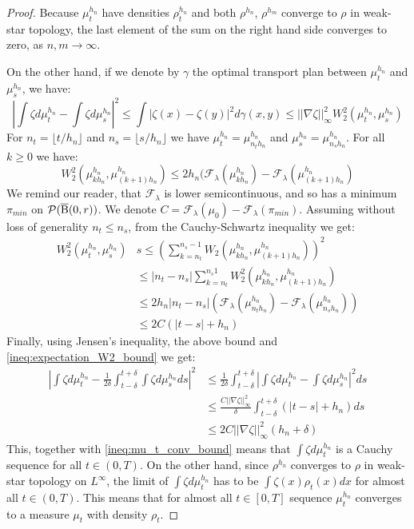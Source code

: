 \begin{proof}
Because $\mu_t^{h_n}$ have densities $\rho_t^{h_n}$ and both $\rho^{h_n}$, $\rho^{h_m}$ converge to $\rho$ in weak-star topology, the last element of the sum on the right hand side converges to zero, as $n,m \rightarrow \infty$.

On the other hand, if we denote by $\gamma$ the optimal transport plan between $\mu_t^{h_n}$ and $\mu_s^{h_n}$, we have:
\begin{equation} \label{ineq:expectation_W2_bound}
\left| \int \zeta d\mu_t^{h_n} - \int \zeta d\mu_s^{h_n} \right|^2 \leq \int \left| \zeta(x) - \zeta(y) \right|^2 d\gamma(x,y) \leq ||\nabla \zeta||_{\infty}^2 W_2^2(\mu_t^{h_n}, \mu_s^{h_n})
\end{equation}
For $n_t = \lfloor t/h_n \rfloor$ and $n_s = \lfloor s/h_n \rfloor$ we have $\mu_t^{h_n} = \mu_{n_t h_n}^{h_n}$ and $\mu_s^{h_n} = \mu_{n_s h_n}^{h_n}$. For all $k \geq 0$ we have:
\[
W_2^2(\mu_{kh_n}^{h_n}, \mu_{(k+1)h_n}^{h_n}) \leq 2h_n(\mathcal{F}_{\lambda}(\mu_{kh_n}^{h_n}) - \mathcal{F}_{\lambda}(\mu_{(k+1)h_n}^{h_n}) 
\]
We remind our reader, that $\mathcal{F}_{\lambda}$ is lower semicontinuous, and so has a minimum $\pi_{min}$ on $\mathcal{P}(\operatorname{\overline{B}}(0,r))$. We denote $C = \mathcal{F}_{\lambda}(\mu_0) - \mathcal{F}_{\lambda}(\pi_{min})$. Assuming without loss of generality $n_t \leq n_s$, from the Cauchy-Schwartz inequality we get:
\[
\begin{aligned}
W_2^2(\mu_{t}^{h_n}, \mu_s^{h_n}) & s\leq \left( \sum_{k= n_t}^{n_s-1} W_2(\mu_{kh_n}^{h_n}, \mu_{(k+1)h_n}^{h_n}) \right)^2 \\
& \leq |n_t - n_s|\sum_{k=n_t}^{n_s 1} W_2^2(\mu_{kh_n}^{h_n}, \mu_{(k+1)h_n}^{h_n}) \\
& \leq 2h_n|n_t - n_s|(\mathcal{F}_{\lambda}(\mu_{n_t h_n}^{h_n}) - \mathcal{F}_{\lambda}(\mu_{n_s h_n}^{h_n})) \\
& \leq 2C(|t-s| + h_n)
\end{aligned}
\]
Finally, using Jensen's inequality, the above bound and \ref{ineq:expectation_W2_bound} we get:
\[
\begin{aligned}
\left| \int \zeta d\mu_t^{h_n} - \frac{1}{2\delta} \int_{t - \delta}^{t + \delta} \int \zeta d\mu_s^{h_n} ds \right|^2 & \leq \frac{1}{2\delta} \int_{t - \delta}^{t + \delta} \left| \int \zeta d\mu_{t}^{h_n} - \int \zeta d\mu_s^{h_n} \right|^2 ds \\
& \leq \frac{C ||\nabla \zeta||_{\infty}^2}{\delta} \int_{t-\delta}^{t+\delta} (|t-s| +h_n) ds \\
& \leq 2C ||\nabla \zeta||_{\infty}^2 (h_n + \delta)
\end{aligned}
\]
This, together with \ref{ineq:mu_t_conv_bound} means that $\int \zeta d\mu_t^{h_n}$ is a Cauchy sequence for all $t \in (0, T)$. On the other hand, since $\rho^{h_n}$ converges to $\rho$ in weak-star topology on $L^{\infty}$, the limit of $\int \zeta d\mu_t^{h_n}$ has to be $\int \zeta(x) \rho_t(x) dx$ for almost all $t \in (0,T)$. This means that for almost all $t \in [0,T]$ sequence $\mu_{t}^{h_n}$ converges to a measure $\mu_t$ with density $\rho_t$.


\end{proof}
